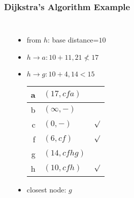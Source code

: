 \documentclass[dvipsnames]{beamer}
\begin{document}
\begin{frame}
  \frametitle{Dijkstra's Algorithm Example}

  \begin{columns}
    \begin{center}
    \end{center}

    \begin{itemize}
      \item from $h$: base distance=$10$
      \item $h \rightarrow a: 10+11, 21 \nless 17$
      \item $h \rightarrow g: 10+4, 14 < 15$

      \pause
      \begin{table}
        \begin{tabular}{r|l|c}
          a & $(17,cfa)$   & \\\hline
          b & $(\infty,-)$ & \\\hline
          c & $(0,-)$      & $\surd$ \\\hline
          f & $(6,cf)$     & $\surd$ \\\hline
          g & $(14,cfhg)$  & \\\hline
          h & $(10,cfh)$   & $\surd$
        \end{tabular}
      \end{table}

      \pause
      \item closest node: $g$
    \end{itemize}
  \end{columns}
\end{frame}
\end{document}
